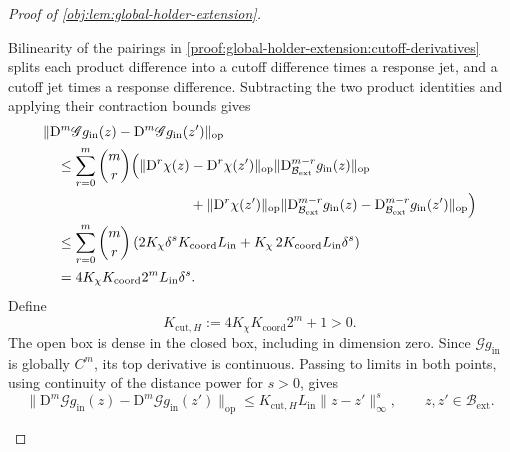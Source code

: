 \begin{proof}[Proof of \cref{obj:lem:global-holder-extension}]
\begin{enumerate}
Bilinearity of the pairings in \cref{proof:global-holder-extension:cutoff-derivatives} splits each product difference into a cutoff difference times a response jet, and a cutoff jet times a response difference. Subtracting the two product identities and applying their contraction bounds gives
\[
\begin{aligned}
&\|\mathrm D^m\mathscr G g_{\mathrm{in}}(z)
-\mathrm D^m\mathscr G g_{\mathrm{in}}(z')\|_{\mathrm{op}}\\
&\quad\le
\sum_{r=0}^m\binom mr
\Bigl(
\|\mathrm D^r\chi(z)-\mathrm D^r\chi(z')\|_{\mathrm{op}}
\|\mathrm D_{\mathcal B_{\mathrm{ext}}}^{m-r}g_{\mathrm{in}}(z)\|_{\mathrm{op}}\\
&\hspace{105pt}
+\|\mathrm D^r\chi(z')\|_{\mathrm{op}}
\|\mathrm D_{\mathcal B_{\mathrm{ext}}}^{m-r}g_{\mathrm{in}}(z)
-\mathrm D_{\mathcal B_{\mathrm{ext}}}^{m-r}g_{\mathrm{in}}(z')\|_{\mathrm{op}}
\Bigr)\\
&\quad\le
\sum_{r=0}^m\binom mr
\left(
2K_\chi\delta^s K_{\mathrm{coord}}L_{\mathrm{in}}
+K_\chi\,2K_{\mathrm{coord}}L_{\mathrm{in}}\delta^s
\right)\\
&\quad=
4K_\chi K_{\mathrm{coord}}2^mL_{\mathrm{in}}\delta^s.
\end{aligned}
\]
Define
\[
K_{\mathrm{cut},H}:=4K_\chi K_{\mathrm{coord}}2^m+1>0.
\]
The open box is dense in the closed box, including in dimension zero. Since \(\mathscr G g_{\mathrm{in}}\) is globally \(C^m\), its top derivative is continuous. Passing to limits in both points, using continuity of the distance power for \(s>0\), gives
\[
\|\mathrm D^m\mathscr G g_{\mathrm{in}}(z)
-\mathrm D^m\mathscr G g_{\mathrm{in}}(z')\|_{\mathrm{op}}
\le K_{\mathrm{cut},H}L_{\mathrm{in}}\|z-z'\|_\infty^s,
\qquad z,z'\in\mathcal B_{\mathrm{ext}}.
\]


\end{enumerate}
\end{proof}
